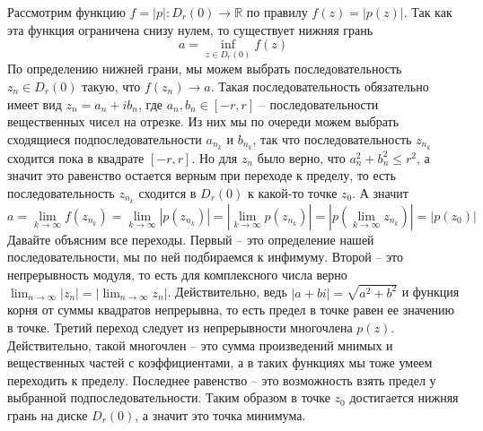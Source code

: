 Рассмотрим функцию $f = |p|\colon D_r(0)\to \mathbb R$ по правилу $f(z) = |p(z)|$.
Так как эта функция ограничена снизу нулем, то существует нижняя грань
\[
a = \inf_{z\in D_r(0)} f(z)
\]
По определению нижней грани, мы можем выбрать последовательность $z_n\in D_r(0)$ такую, что $f(z_n) \to a$.
Такая последовательность обязательно имеет вид $z_n = a_n + i b_n$, где $a_n, b_n\in [-r, r]$ -- последовательности вещественных чисел на отрезке.
Из них мы по очереди можем выбрать сходящиеся подпоследовательности $a_{n_k}$ и $b_{n_k}$, так что последовательность $z_{n_k}$ сходится пока в квадрате $[-r, r]$.
Но для $z_n$ было верно, что $a_n^2 + b_n^2 \leqslant r^2$, а значит это равенство остается верным при переходе к пределу, то есть последовательность $z_{n_k}$ сходится в $D_r(0)$ к какой-то точке $z_0$.
А значит
\[
a = \lim_{k\to \infty} f(z_{n_k}) = \lim_{k\to \infty} |p(z_{n_k})| = \left|\lim_{k\to \infty} p(z_{n_k})\right| = \left|p\left(\lim_{k\to \infty} z_{n_k}\right)\right| = |p(z_0)|
\]
Давайте объясним все переходы.
Первый -- это определение нашей последовательности, мы по ней подбираемся к инфимуму.
Второй -- это непрерывность модуля, то есть для комплексного числа верно $\lim_{n\to \infty}|z_n| = |\lim_{n\to \infty} z_n|$.
Действительно, ведь $|a + bi| = \sqrt{a^2 + b^2}$ и функция корня от суммы квадратов непрерывна, то есть предел в точке равен ее значению в точке.
Третий переход следует из непрерывности многочлена $p(z)$.
Действительно, такой многочлен -- это сумма произведений мнимых и вещественных частей с коэффициентами, а в таких функциях мы тоже умеем переходить к пределу.
Последнее равенство -- это возможность взять предел у выбранной подпоследовательности.
Таким образом в точке $z_0$ достигается нижняя грань на диске $D_r(0)$, а значит это точка минимума.
